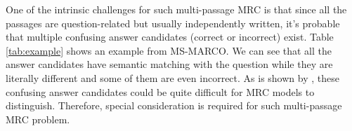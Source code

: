 \documentclass[11pt,a4paper]{article}
\newcommand{\tabref}[1]{Table \ref{#1}}
\begin{document}
One of the intrinsic challenges for such multi-passage MRC is that since all the passages are question-related but usually independently written, it's probable that multiple confusing answer candidates (correct or incorrect) exist. \tabref{tab:example} shows an example from MS-MARCO. We can see that all the answer candidates have semantic matching with the question while they are literally different and some of them are even incorrect. As is shown by , these confusing answer candidates could be quite difficult for MRC models to distinguish. Therefore, special consideration is required for such multi-passage MRC problem.

\begin{comment}
\begin{table*}[htbp]

\centering
\begin{tabular}{p{\textwidth}}
\hline
\textbf{Question: }What are overtones in music? \\
\hline
\textbf{Passages:} \\


\textbf{[1]} \ldots  full definition of overtone: 1. \textbf{one of the higher tones produced simultaneously with the fundamental and that with the fundamental comprise a complex musical tone} 2. the color of the light reflected (as by a paint) \ldots \\


\textbf{[2]} \textbf{The term overtone is used to refer to any resonant frequency above the fundamental frequency-an overtone may or may not be a harmonic.} Many of the instruments of the orchestra, those utilizing strings or air columns, produce the fundamental frequency and harmonics. \\

\textbf{[3]} \textbf{An overtone is any frequency higher than the fundamental frequency of a sound.} Using the model of Fourier analysis, the fundamental and the overtones together are called partials \ldots \\


\textbf{[4]} \textbf{Overtones Music Studio is a place where you are invited to come experience music for life. Overtones offers a unique musical experience that opens the world of music to people of all ages in a fun, creative, affordable and exciting way.} \ldots 






\textbf{[5]} Let Overtones Music Studio provide a unique musical experience for your classroom, early learning center, 
 Please contact us for any questions not answered there. \textbf{Kidzrock is a music program that teaches children as young as 4 how to play an instrument in the setting of a real rock band.}  \\



\end{comment}
\end{document}
